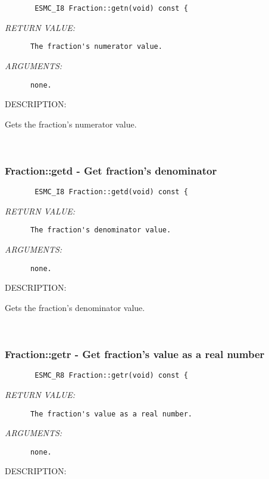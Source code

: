   
\begin{verbatim}       ESMC_I8 Fraction::getn(void) const {\end{verbatim}{\em RETURN VALUE:}
\begin{verbatim}      The fraction's numerator value.\end{verbatim}{\em ARGUMENTS:}
\begin{verbatim}      none.\end{verbatim}
{\sf DESCRIPTION:\\ }


       Gets the fraction's numerator value.
   
 
\mbox{}\hrulefill\ 
 
\subsubsection [Fraction::getd] {Fraction::getd - Get fraction's denominator}


  
\begin{verbatim}       ESMC_I8 Fraction::getd(void) const {\end{verbatim}{\em RETURN VALUE:}
\begin{verbatim}      The fraction's denominator value.\end{verbatim}{\em ARGUMENTS:}
\begin{verbatim}      none.\end{verbatim}
{\sf DESCRIPTION:\\ }


       Gets the fraction's denominator value.
   
 
\mbox{}\hrulefill\ 
 
\subsubsection [Fraction::getr] {Fraction::getr - Get fraction's value as a real number}


  
\begin{verbatim}       ESMC_R8 Fraction::getr(void) const {\end{verbatim}{\em RETURN VALUE:}
\begin{verbatim}      The fraction's value as a real number.\end{verbatim}{\em ARGUMENTS:}
\begin{verbatim}      none.\end{verbatim}
{\sf DESCRIPTION:\\ }



